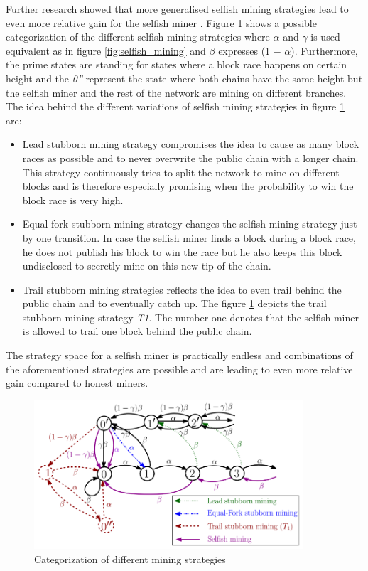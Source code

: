 \documentclass{scrartcl}
\begin{document}
Further research showed that more generalised selfish mining strategies lead to even more relative gain for the selfish miner \cite{nayak2016stubborn,sapirshtein2016optimal, gervais2015tampering, gervais2016security, bahack2013theoretical}.
Figure \ref{fig:stubborn_mining} shows a possible categorization of the different selfish mining strategies where $\alpha$ and $\gamma$ is used equivalent as in figure \ref{fig:selfish_mining} and $\beta$ expresses (1 − $\alpha$).
Furthermore, the prime states are standing for states where a block race happens on certain height and the \textit{0''} represent the state where both chains have the same height but the selfish miner and the rest of the network are mining on different branches.
The idea behind the different variations of selfish mining strategies in figure \ref{fig:stubborn_mining} are:
\begin{itemize}
\item Lead stubborn mining strategy compromises the idea to cause as many block races as possible and to never overwrite the public chain with a longer chain.
This strategy continuously tries to split the network to mine on different blocks and is therefore especially promising when the probability to win the block race is very high.
\item Equal-fork stubborn mining strategy changes the selfish mining strategy just by one transition.
In case the selfish miner finds a block during a block race, he does not publish his block to win the race but he also keeps this block undisclosed to secretly mine on this new tip of the chain.
\item Trail stubborn mining strategies reflects the idea to even trail behind the public chain and to eventually catch up.
The figure \ref{fig:stubborn_mining} depicts the trail stubborn mining strategy \textit{T1}.
The number one denotes that the selfish miner is allowed to trail one block behind the public chain.
\end{itemize}

The strategy space for a selfish miner is practically endless and combinations of the aforementioned strategies are possible and are leading to even more relative gain compared to honest miners\cite{nayak2016stubborn,sapirshtein2016optimal, gervais2015tampering, gervais2016security, bahack2013theoretical}.


\begin{figure}[t]
\includegraphics[width=10cm]{figures/stubborn_mining}
\centering
\caption{Categorization of different mining strategies \cite{nayak2016stubborn}}
\label{fig:stubborn_mining}
\end{figure}
\end{document}
